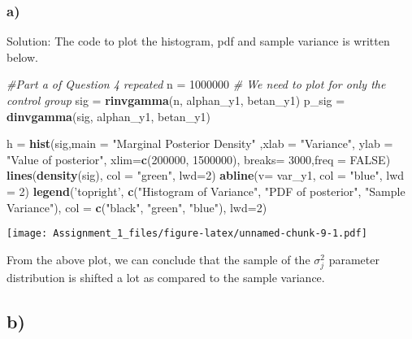 \documentclass[]{article}
\newenvironment{Shaded}{\begin{snugshade}}{\end{snugshade}}
\newcommand{\KeywordTok}[1]{\textcolor[rgb]{0.13,0.29,0.53}{\textbf{{#1}}}}
\newcommand{\DataTypeTok}[1]{\textcolor[rgb]{0.13,0.29,0.53}{{#1}}}
\newcommand{\DecValTok}[1]{\textcolor[rgb]{0.00,0.00,0.81}{{#1}}}
\newcommand{\StringTok}[1]{\textcolor[rgb]{0.31,0.60,0.02}{{#1}}}
\newcommand{\CommentTok}[1]{\textcolor[rgb]{0.56,0.35,0.01}{\textit{{#1}}}}
\newcommand{\OtherTok}[1]{\textcolor[rgb]{0.56,0.35,0.01}{{#1}}}
\newcommand{\NormalTok}[1]{{#1}}
\begin{document}
\subsubsection{a)}\label{a-4}

Solution: The code to plot the histogram, pdf and sample variance is
written below.

\begin{Shaded}
\begin{Highlighting}[]
\CommentTok{#Part a of Question 4 repeated}
\NormalTok{n =}\StringTok{ }\DecValTok{1000000}
\CommentTok{# We need to plot for only the control group}
\NormalTok{sig =}\StringTok{ }\KeywordTok{rinvgamma}\NormalTok{(n, alphan_y1, betan_y1)}
\NormalTok{p_sig =}\StringTok{ }\KeywordTok{dinvgamma}\NormalTok{(sig, alphan_y1, betan_y1)}

\NormalTok{h =}\StringTok{ }\KeywordTok{hist}\NormalTok{(sig,}\DataTypeTok{main =} \StringTok{"Marginal Posterior Density"} \NormalTok{,}\DataTypeTok{xlab =} \StringTok{"Variance"}\NormalTok{, }\DataTypeTok{ylab =} \StringTok{"Value of posterior"}\NormalTok{, }\DataTypeTok{xlim=}\KeywordTok{c}\NormalTok{(}\DecValTok{200000}\NormalTok{, }\DecValTok{1500000}\NormalTok{), }\DataTypeTok{breaks=} \DecValTok{3000}\NormalTok{,}\DataTypeTok{freq =} \OtherTok{FALSE}\NormalTok{)}
\KeywordTok{lines}\NormalTok{(}\KeywordTok{density}\NormalTok{(sig), }\DataTypeTok{col =} \StringTok{"green"}\NormalTok{, }\DataTypeTok{lwd=}\DecValTok{2}\NormalTok{)}
\KeywordTok{abline}\NormalTok{(}\DataTypeTok{v=} \NormalTok{var_y1, }\DataTypeTok{col =} \StringTok{"blue"}\NormalTok{, }\DataTypeTok{lwd =} \DecValTok{2}\NormalTok{)}
\KeywordTok{legend}\NormalTok{(}\StringTok{'topright'}\NormalTok{, }\KeywordTok{c}\NormalTok{(}\StringTok{"Histogram of Variance"}\NormalTok{, }\StringTok{"PDF of posterior"}\NormalTok{, }\StringTok{"Sample Variance"}\NormalTok{), }\DataTypeTok{col =} \KeywordTok{c}\NormalTok{(}\StringTok{"black"}\NormalTok{, }\StringTok{"green"}\NormalTok{, }\StringTok{"blue"}\NormalTok{), }\DataTypeTok{lwd=}\DecValTok{2}\NormalTok{)}
\end{Highlighting}
\end{Shaded}

\texttt{[image: Assignment\_1\_files/figure-latex/unnamed-chunk-9-1.pdf]}

From the above plot, we can conclude that the sample of the
\(\sigma_j^2\) parameter distribution is shifted a lot as compared to
the sample variance.

\subsection{b)}\label{b-3}
\end{document}
